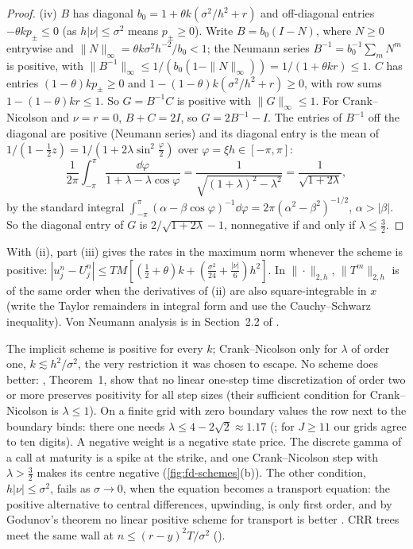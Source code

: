 \begin{proof}
(iv) $B$ has diagonal $b_0=1+\theta k(\sigma^2/h^2+r)$ and off-diagonal entries $-\theta kp_\pm\le0$ (as
$h|\nu|\le\sigma^2$ means $p_\pm\ge0$). Write $B=b_0(I-N)$, where $N\ge0$ entrywise and
$\|N\|_\infty=\theta k\sigma^2h^{-2}/b_0<1$; the Neumann series $B^{-1}=b_0^{-1}\sum_mN^m$ is positive, with
$\|B^{-1}\|_\infty\le1/(b_0(1-\|N\|_\infty))=1/(1+\theta kr)\le1$. $C$ has entries $(1-\theta)kp_\pm\ge0$ and
$1-(1-\theta)k(\sigma^2/h^2+r)\ge0$, with row sums $1-(1-\theta)kr\le1$. So $G=B^{-1}C$ is positive with
$\|G\|_\infty\le1$. For Crank--Nicolson and $\nu=r=0$, $B+C=2I$, so $G=2B^{-1}-I$. The entries of
$B^{-1}$ off the diagonal are positive (Neumann series) and its diagonal entry is the mean of
$1/(1-\frac12z)=1/(1+2\lambda\sin^2\frac\varphi2)$ over $\varphi=\xi h\in[-\pi,\pi]$:
\[
  \frac1{2\pi}\int_{-\pi}^{\pi}\frac{\dd\varphi}{1+\lambda-\lambda\cos\varphi}=\frac1{\sqrt{(1+\lambda)^2-\lambda^2}}=\frac1{\sqrt{1+2\lambda}},
\]
by the standard integral $\int_{-\pi}^\pi(\alpha-\beta\cos\varphi)^{-1}\dd\varphi=2\pi(\alpha^2-\beta^2)^{-1/2}$, $\alpha>|\beta|$. So the
diagonal entry of $G$ is $2/\sqrt{1+2\lambda}-1$, nonnegative if and only if $\lambda\le\frac32$.
\end{proof}

With (ii), part (iii) gives the rates in the maximum norm whenever the scheme is positive:
$|u^n_j-U^n_j|\le TM[(\frac12+\theta)k+(\frac{\sigma^2}{24}+\frac{|\nu|}6)h^2]$. In $\|\cdot\|_{2,h}$, $\|T^m\|_{2,h}$ is of the same
order when the derivatives of (ii) are also square-integrable in $x$ (write the Taylor remainders
in integral form and use the Cauchy--Schwarz inequality). Von Neumann analysis is in Section~2.2
of \textcite{strikwerda-finite-difference}.

\begin{remark}\label{rem:fd-positivity}
The implicit scheme is positive for every $k$; Crank--Nicolson only for $\lambda$ of order one,
$k\lesssim h^2/\sigma^2$, the very restriction it was chosen to escape. No scheme does better:
\textcite{bolley-crouzeix-1978}, Theorem~1, show that no linear one-step time discretization of
order two or more preserves positivity for all step sizes (their sufficient condition for
Crank--Nicolson is $\lambda\le1$). On a finite grid with zero boundary values the row next to the
boundary binds: there one needs $\lambda\le4-2\sqrt2\approx1.17$ (; for $J\ge11$
our grids agree to ten digits). A negative weight is a negative state price. The discrete gamma of a
call at maturity is a spike at the strike, and one Crank--Nicolson step with $\lambda>\frac32$ makes its
centre negative (\cref{fig:fd-schemes}(b)). The other condition, $h|\nu|\le\sigma^2$, fails as $\sigma\to0$, when
the equation becomes a transport equation: the positive alternative to central differences,
upwinding, is only first order, and by Godunov's theorem no linear positive scheme for
transport is better \citep{godunov-1959}. CRR trees meet the same wall at $n\le(r-y)^2T/\sigma^2$
().
\end{remark}

